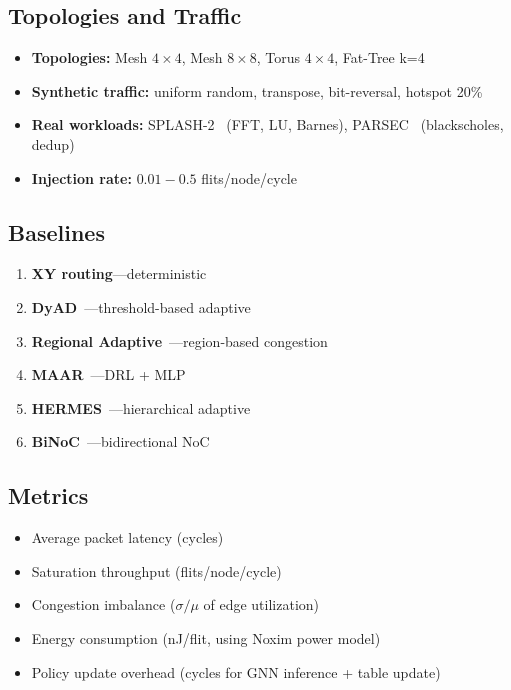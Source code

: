\documentclass[conference]{IEEEtran}
\begin{document}
\subsection{Topologies and Traffic}
\begin{itemize}
 \item \textbf{Topologies:} Mesh $4\times4$, Mesh $8\times8$, Torus $4\times4$, Fat-Tree k=4
 \item \textbf{Synthetic traffic:} uniform random, transpose, bit-reversal, hotspot 20\%
 \item \textbf{Real workloads:} SPLASH-2~\cite{splash2} (FFT, LU, Barnes), PARSEC~\cite{parsec} (blackscholes, dedup)
 \item \textbf{Injection rate:} $0.01{-}0.5$ flits/node/cycle
\end{itemize}

\subsection{Baselines}
\begin{enumerate}
 \item \textbf{XY routing}---deterministic
 \item \textbf{DyAD}~\cite{dyad2004}---threshold-based adaptive
 \item \textbf{Regional Adaptive}~\cite{ebrahimi2019}---region-based congestion
 \item \textbf{MAAR}~\cite{wang2022maar}---DRL + MLP
 \item \textbf{HERMES}~\cite{hermes2023}---hierarchical adaptive
 \item \textbf{BiNoC}~\cite{binoc2024}---bidirectional NoC
\end{enumerate}

\subsection{Metrics}
\begin{itemize}
 \item Average packet latency (cycles)
 \item Saturation throughput (flits/node/cycle)
 \item Congestion imbalance ($\sigma/\mu$ of edge utilization)
 \item Energy consumption (nJ/flit, using Noxim power model)
 \item Policy update overhead (cycles for GNN inference + table update)
\end{itemize}
\end{document}
